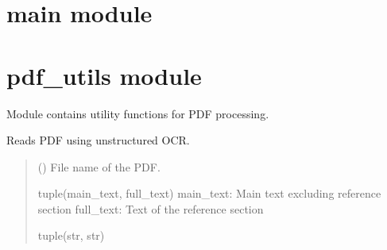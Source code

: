\documentclass[letterpaper,10pt,english]{sphinxmanual}
\begin{document}
\sphinxstepscope


\section{main module}
\label{\detokenize{main:main-module}}\label{\detokenize{main::doc}}
\sphinxstepscope


\section{pdf\_utils module}
\label{\detokenize{pdf_utils:module-pdf_utils}}\label{\detokenize{pdf_utils:pdf-utils-module}}\label{\detokenize{pdf_utils::doc}}
\sphinxAtStartPar
Module contains utility functions for PDF processing.

\begin{fulllineitems}
\label{\detokenize{pdf_utils:pdf_utils.read_pdf}}
\pysigstartsignatures
\pysiglinewithargsret
{}
{}
{}
\pysigstopsignatures
\sphinxAtStartPar
Reads PDF using unstructured OCR.
\begin{quote}\begin{description}
\sphinxAtStartPar
{} () \textendash{} File name of the PDF.

\sphinxAtStartPar
tuple(main\_text, full\_text)
main\_text: Main text excluding reference section
full\_text: Text of the reference section

\sphinxAtStartPar
tuple(str, str)

\end{description}\end{quote}

\end{fulllineitems}

\end{document}
